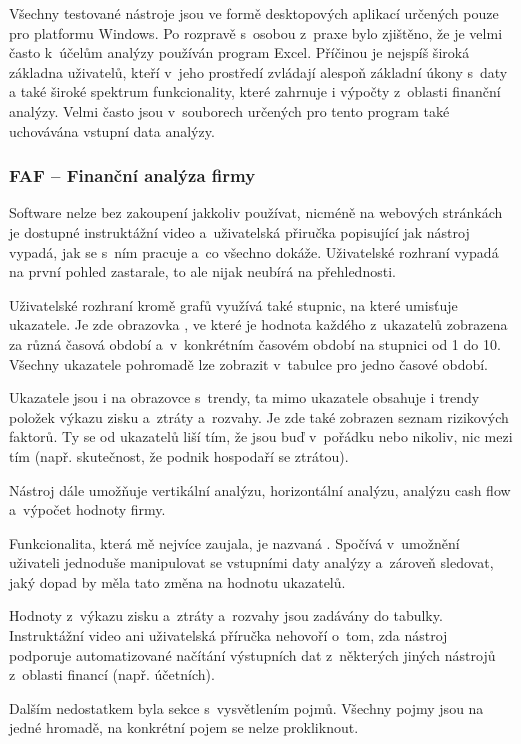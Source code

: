 Všechny testované nástroje jsou ve formě desktopových aplikací určených pouze pro platformu Windows. Po rozpravě s~osobou z~praxe bylo zjištěno, že je velmi často k~účelům analýzy používán program Excel. Příčinou je nejspíš široká základna uživatelů, kteří v~jeho prostředí zvládají alespoň základní úkony s~daty a také široké spektrum funkcionality, které zahrnuje i výpočty z~oblasti finanční analýzy. Velmi často jsou v~souborech určených pro tento program také uchovávána vstupní data analýzy.

\subsubsection{FAF -- Finanční analýza firmy}
Software nelze bez zakoupení jakkoliv používat, nicméně na webových stránkách je dostupné instruktážní video a~uživatelská přiručka popisující jak nástroj vypadá, jak se s~ním pracuje a~co všechno dokáže. Uživatelské rozhraní vypadá na první pohled zastarale, to ale nijak neubírá na přehlednosti.

Uživatelské rozhraní kromě grafů využívá také stupnic, na které umisťuje ukazatele. Je zde obrazovka , ve které je hodnota každého z~ukazatelů zobrazena za různá časová období a~v~konkrétním časovém období na stupnici od 1 do 10. Všechny ukazatele pohromadě lze zobrazit v~tabulce pro jedno časové období.

Ukazatele jsou i na obrazovce s~trendy, ta mimo ukazatele obsahuje i trendy položek výkazu zisku a~ztráty a~rozvahy. Je zde také zobrazen seznam rizikových faktorů. Ty se od ukazatelů liší tím, že jsou buď v~pořádku nebo nikoliv, nic mezi tím (např. skutečnost, že podnik hospodaří se ztrátou).

Nástroj dále umožňuje vertikální analýzu, horizontální analýzu, analýzu cash flow a~výpočet hodnoty firmy.

Funkcionalita, která mě nejvíce zaujala, je nazvaná . Spočívá v~umožnění uživateli jednoduše manipulovat se vstupními daty analýzy a~zároveň sledovat, jaký dopad by měla tato změna na hodnotu ukazatelů.

Hodnoty z~výkazu zisku a~ztráty a~rozvahy jsou zadávány do tabulky. Instruktážní video ani uživatelská příručka nehovoří o~tom, zda nástroj podporuje automatizované načítání výstupních dat z~některých jiných nástrojů z~oblasti financí (např. účetních).

Dalším nedostatkem byla sekce s~vysvětlením pojmů. Všechny pojmy jsou na jedné hromadě, na konkrétní pojem se nelze prokliknout.


